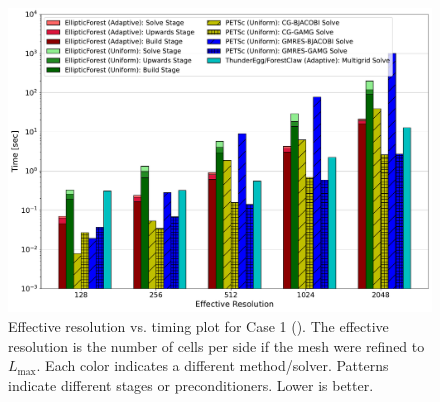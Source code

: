     \begin{figure}
        \centering
        \includegraphics[width=1.0\textwidth, clip=true, trim={0 0 0 0}]{figures/case01-stacked-bar-plot-comparisons-no-title.pdf}
        \caption{Effective resolution vs. timing plot for Case 1 (). The effective resolution is the number of cells per side if the mesh were refined to $L_{\text{max}}$. Each color indicates a different method/solver. Patterns indicate different stages or preconditioners. Lower is better.}
        \label{fig:case01-stacked-bar-plot}
    \end{figure}

